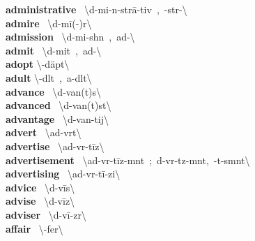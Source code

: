 \documentclass[10pt,a4paper]{article}
\begin{document}
\begin{multicols}{2}
\textbf{ administrative }\quad \ \textbackslash \textschwa d-\textprimstress mi-n\textschwa -\textsecstress str\={a}-tiv\ ,\ -str\textschwa -\textbackslash \\
\textbf{ admire }\quad \ \textbackslash \textschwa d-\textprimstress m\={i}(-\textschwa )r\textbackslash \\
\textbf{ admission }\quad \ \textbackslash \textschwa d-\textprimstress mi-sh\textschwa n\ ,\ ad-\textbackslash \\
\textbf{ admit }\quad \ \textbackslash \textschwa d-\textprimstress mit\ ,\ ad-\textbackslash \\
\textbf{ adopt }\quad \textbackslash \textschwa -\textprimstress d\"{a}pt\textbackslash \\
\textbf{ adult }\quad \textbackslash \textschwa -\textprimstress d\textschwa lt\ ,\ \textprimstress a-\textsecstress d\textschwa lt\textbackslash \\
\textbf{ advance }\quad \ \textbackslash \textschwa d-\textprimstress van(t)s\textbackslash \\
\textbf{ advanced }\quad \ \textbackslash \textschwa d-\textprimstress van(t)st\textbackslash \\
\textbf{ advantage }\quad \ \textbackslash \textschwa d-\textprimstress van-tij\textbackslash \\
\textbf{ advert }\quad \ \textbackslash ad-\textprimstress v\textschwa rt\textbackslash \\
\textbf{ advertise }\quad \ \textbackslash \textprimstress ad-v\textschwa r-\textsecstress t\={i}z\textbackslash \\
\textbf{ advertisement }\quad \ \textbackslash \textsecstress ad-v\textschwa r-\textprimstress t\={i}z-m\textschwa nt\ ;\ \textschwa d-\textprimstress v\textschwa r-t\textschwa z-m\textschwa nt,\ -t\textschwa -sm\textschwa nt\textbackslash \\
\textbf{ advertising }\quad \ \textbackslash \textprimstress ad-v\textschwa r-\textsecstress t\={i}-zi\engma \textbackslash \\
\textbf{ advice }\quad \ \textbackslash \textschwa d-\textprimstress v\={i}s\textbackslash \\
\textbf{ advise }\quad \ \textbackslash \textschwa d-\textprimstress v\={i}z\textbackslash \\
\textbf{ adviser }\quad \ \textbackslash \textschwa d-\textprimstress v\={i}-z\textschwa r\textbackslash \\
\textbf{ affair }\quad \ \textbackslash \textschwa -\textprimstress fer\textbackslash \\

\end{multicols}
\end{document}

